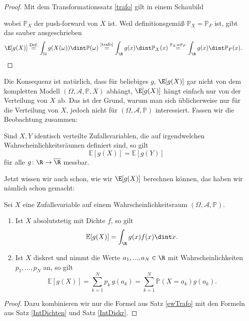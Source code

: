 \begin{proof}
	Mit dem Transformationssatz \ref{trafo} gilt in einem Schaubild 
\begin{center}		
\end{center}
wobei $\mathbb P_X$ der push-forward von $X$ ist. Weil definitionsgem\"a\ss{} $\mathbb P_X=\mathbb P_F$ ist, gibt das sauber ausgeschrieben
\begin{align*}
	\E[g(X)] &\overset{\text{Def.}}{=} \int_{\Omega} g(X(\omega)) \dint \mathbb{P}(\omega)
	 \overset{\text{\ref{trafo}}}{=} \int_{\R} g(x) \dint \mathbb{P}_X(x)
	 \overset{\mathbb P_X=\mathbb P_F}{=} \int_{\R} g(x) \dint \mathbb{P}_F(x).
\end{align*}
\end{proof}
Die Konsequenz ist nat\"urlich, dass f\"ur beliebiges $g$, $\E[g(X)]$ gar nicht von dem kompletten Modell $(\Omega, \mathcal A, \mathbb P,X)$ abh\"angt, $\E[g(X)]$ h\"angt einfach nur von der Verteilung von $X$ ab. Das ist der Grund, warum man sich \"ublicherweise nur f\"ur die Verteilung von $X$, jedoch nicht f\"ur $(\Omega, \mathcal A, \mathbb P)$ interessiert. Fassen wir die Beobachtung zusammen:
\begin{bem1}
	Sind $X, Y$ identisch verteilte Zufallsvariablen, die auf irgendwelchen Wahrscheinlichkeitsräumen definiert sind, so gilt
		\[ \mathbb{E}[g(X)] = \mathbb{E}[g(Y)] \] für alle $g \colon \R \to \overline{\R}$ messbar.
\end{bem1}
Jetzt wissen wir auch schon, wie wir $\E[g(X)]$ berechnen k\"onnen, das haben wir n\"amlich schon gemacht:
\begin{satz}[Berechnungsregeln]\label{regeln}
	Sei $X$ eine Zufallsvariable auf einem Wahrscheinlichkeitsraum $(\Omega, \mathcal A, \mathbb P)$.
	\begin{enumerate}[label=(\roman*)]
		\item\label{(i)} Ist $X$ absolutstetig mit Dichte $f$, so gilt \[ \mathbb{E}[g(X)] = \int_{\R} g(x) f(x) \dint x. \]
		\item\label{ii} Ist $X$ diskret und nimmt die Werte $a_1, ..., a_N\in\R$ mit Wahrscheinlichkeiten $p_1, ..., p_N$ an, so gilt
		 \[ \mathbb{E}[g(X)] = \sum\limits_{k=1}^{N} p_k\, g(a_k)=  \sum\limits_{k=1}^{N}  \mathbb{P}(X=a_k)g(a_k). \]
	\end{enumerate}
\end{satz}
\begin{proof}
	Dazu kombinieren wir nur die Formel aus Satz	\ref{ewTrafo} mit den Formeln aus Satz \ref{IntDichten} und Satz \ref{IntDiskr}.
\end{proof}

